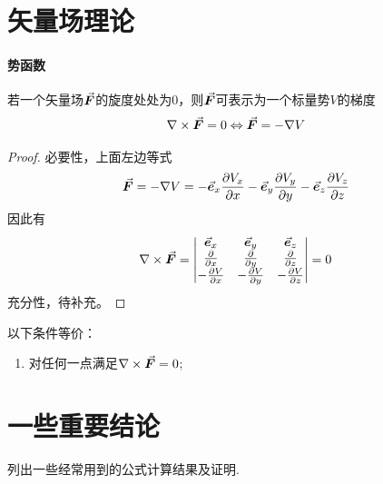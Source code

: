 \section{矢量场理论}
\paragraph{势函数}
若一个矢量场$\vec{\bm{F}}$的旋度处处为0，则$\vec{\bm{F}}$可表示为一个标量势$V$的梯度
\begin{equation}
    \nabla \times \vec{\bm{F}} = 0 \Leftrightarrow \vec{\bm{F}} = -\nabla V
    \label{eq:scalar-poten}
\end{equation}
\begin{proof}
    必要性，上面左边等式
    \begin{equation*}
        \vec{\bm{F}} = - \nabla V = -\vec{\bm{e}}_x \frac{\partial V_x}{\partial x}
                            -\vec{\bm{e}}_y \frac{\partial V_y}{\partial y}
                            -\vec{\bm{e}}_z \frac{\partial V_z}{\partial z}
    \end{equation*}
    因此有
    \begin{equation*}
        \nabla \times \vec{\bm{F}} = \left|\begin{matrix}
            \vec{\bm{e}}_x  &   \vec{\bm{e}}_y  &   \vec{\bm{e}}_z  \\
            \frac{\partial}{\partial x} & \frac{\partial}{\partial y} & \frac{\partial}{\partial z} \\
            -\frac{\partial V}{\partial x} & -\frac{\partial V}{\partial y} & -\frac{\partial V}{\partial z}
        \end{matrix}\right|
        = 0
    \end{equation*}
    充分性，待补充。
\end{proof}

\begin{theorem}[无旋场]
    以下条件等价：
    \begin{enumerate}
        \item 对任何一点满足$\nabla \times \vec{\bm{F}} = 0$;
    \end{enumerate}
\end{theorem}

\section{一些重要结论}
列出一些经常用到的公式计算结果及证明.

